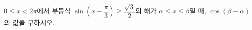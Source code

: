 $0\le x<2\pi$에서 부등식 $\sin\left(x-\dfrac{\pi}{3}\right)\ge\dfrac{\sqrt{3}}{2}$의 해가 $\alpha\le x\le\beta$일 때, $\cos(\beta-\alpha)$의 값을 구하시오.
